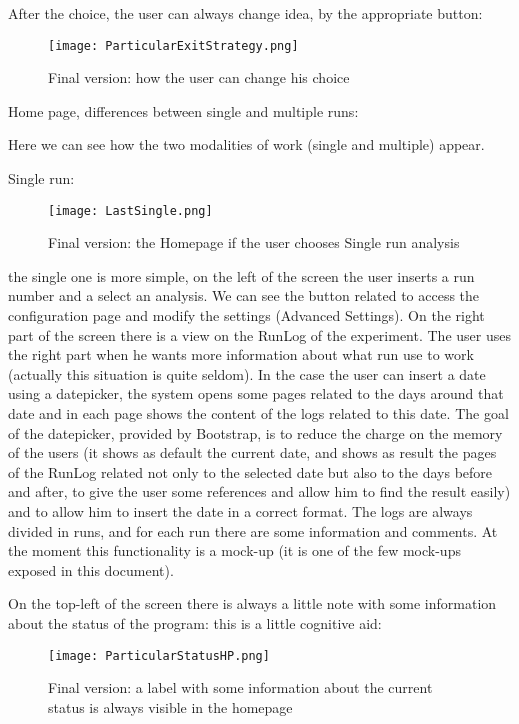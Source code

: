 After the choice, the user can always change idea, by the appropriate button:

\begin{figure}[H]
\centering
\texttt{[image: ParticularExitStrategy.png]} 
\caption{Final version: how the user can change his choice}
\end{figure}

\newpage
Home page, differences between single and multiple runs:

Here we can see how the two modalities of work (single and multiple) appear.

Single run: 
\begin{figure}[H]
\centering
\texttt{[image: LastSingle.png]} 
\caption{Final version: the Homepage if the user chooses Single run analysis}
\end{figure}

the single one is more simple, on the left of the screen the user inserts a run number and a select an analysis. We can see the button related to access the configuration page and modify the settings (Advanced Settings). On the right part of the screen there is a view on the RunLog of the experiment. The user uses the right part when he wants more information about what run use to work (actually this situation is quite seldom). In the case the user can insert a date using a datepicker, the system opens some pages related to the days around that date and in each page shows the content of the logs related to this date. The goal of the datepicker, provided by Bootstrap, is to reduce the charge on the memory of the users (it shows as default the current date, and shows as result the pages of the RunLog related not only to the selected date but also to the days before and after, to give the user some references and allow him to find the result easily) and to allow him to insert the date in a correct format. The logs are always divided in runs, and for each run there are some information and comments. At the moment this functionality is a mock-up (it is one of the few  mock-ups exposed in this document). 

On the top-left of the screen there is always a little note with some information about the status of the program: this is a little cognitive aid:


\begin{figure}[H]
\centering
\texttt{[image: ParticularStatusHP.png]} 
\caption{Final version: a label with some information about the current status is always visible in the homepage}
\end{figure}    
 


